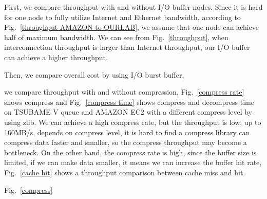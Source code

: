 First, we compare throughput with and without I/O buffer nodes.
Since it is hard for one node to fully utilize Internet and Ethernet bandwidth, according to Fig.~\ref{throughput AMAZON to OURLAB}, we assume that one node can achieve half of maximum bandwidth.
We can see from Fig.~\ref{throughput}, when interconnection throughput is larger than Internet throughput, our I/O buffer can achieve a higher throughput.

Then, we compare overall cost by using I/O burst buffer, 

we compare throughput with and without compression, Fig.~\ref{compress rate} shows compress and Fig.~\ref{compress time} shows compress and decompress time on TSUBAME V queue and AMAZON EC2 with a different compress level by using zlib\cite{zlib}.
We can achieve a high compress rate, but the throughput is low, up to 160MB/s, depends on compress level, it is hard to find a compress library can compress data faster and smaller, so the compress throughput may become a bottleneck.
On the other hand, the compress rate is high, since the buffer size is limited, if we can make data smaller, it means we can increase the buffer hit rate, Fig.~\ref{cache hit} shows a throughput comparison between cache miss and hit.

Fig.~\ref{compress}
